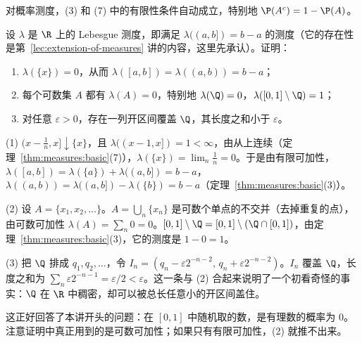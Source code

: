对概率测度，(3) 和 (7) 中的有限性条件自动成立，特别地 $\P(A^c)=1-\P(A)$。

\begin{workedexample}\label{we:measures:rationals}
设 $\lambda$ 是 $\R$ 上的 Lebesgue 测度，即满足 $\lambda((a,b])=b-a$ 的测度（它的存在性是第~\ref{lec:extension-of-measures} 讲的内容，这里先承认）。证明：
\begin{enumerate}
\item $\lambda(\{x\})=0$，从而 $\lambda([a,b])=\lambda((a,b))=b-a$；
\item 每个可数集 $A$ 都有 $\lambda(A)=0$，特别地 $\lambda(\Q)=0$，$\lambda([0,1]\setminus\Q)=1$；
\item 对任意 $\varepsilon>0$，存在一列开区间覆盖 $\Q$，其长度之和小于 $\varepsilon$。
\end{enumerate}
\end{workedexample}
\begin{solution}
(1) $(x-\frac1n,x]\downarrow\{x\}$，且 $\lambda((x-1,x])=1<\infty$，由从上连续（定理~\ref{thm:measures:basic}(7)），$\lambda(\{x\})=\lim_n\frac1n=0$。于是由有限可加性，$\lambda([a,b])=\lambda(\{a\})+\lambda((a,b])=b-a$，$\lambda((a,b))=\lambda((a,b])-\lambda(\{b\})=b-a$（定理~\ref{thm:measures:basic}(3)）。

(2) 设 $A=\{x_1,x_2,\dots\}$。$A=\bigcup_n\{x_n\}$ 是可数个单点的不交并（去掉重复的点），由可数可加性 $\lambda(A)=\sum_n0=0$。$[0,1]\setminus\Q=[0,1]\setminus(\Q\cap[0,1])$，由定理~\ref{thm:measures:basic}(3)，它的测度是 $1-0=1$。

(3) 把 $\Q$ 排成 $q_1,q_2,\dots$，令 $I_n=(q_n-\varepsilon2^{-n-2},\,q_n+\varepsilon2^{-n-2})$。$I_n$ 覆盖 $\Q$，长度之和为 $\sum_n\varepsilon2^{-n-1}=\varepsilon/2<\varepsilon$。这一条与 (2) 合起来说明了一个初看奇怪的事实：$\Q$ 在 $\R$ 中稠密，却可以被总长任意小的开区间盖住。

这正好回答了本讲开头的问题：在 $[0,1]$ 中随机取的数，是有理数的概率为 $0$。注意证明中真正用到的是可数可加性；如果只有有限可加性，(2) 就推不出来。
\end{solution}

